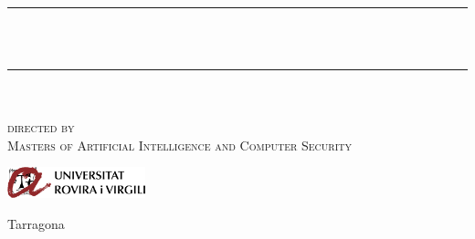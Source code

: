 \begin{titlepage}
	\newcommand{\HRule}{\rule{\linewidth}{0.3mm}} %
	\center %
	
	{\Large\sc\@author}\\[1.5cm] %

	
	
	\HRule\\[0.4cm]
	
	{\huge\bfseries \@title}\\[0.4cm]
	
	\HRule\\[1.5cm]

	\textsc{\Large \deliverableName}\\[1.5cm]
	
	

	\textsc{\large directed by \directedBy}\\[0.5cm]
		
	\textsc{\large Masters of Artificial Intelligence and Computer Security}\\[0.5cm]
	
	\vfill\vfill
	
	
	\vfill
	\includegraphics[width=0.3\textwidth]{./urvlogo.png}
	
	
	
	\vfill
	
	{\large Tarragona}\\
	
	{\large\@date} %
	
	
\end{titlepage}
